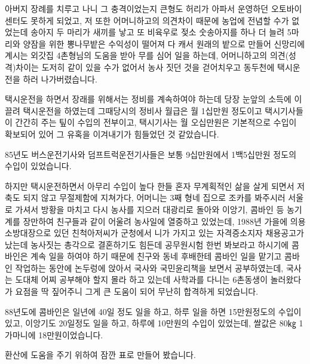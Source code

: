\documentclass[chapter,book,openany,twoside]{oblivoir}
\begin{document}
아버지 장례를 치루고 나니 그 충격이었는지 큰형도 허리가 아파서 운영하던 오토바이센터도 못하게 되었고, 저 또한 어머니하고의 의견차이 때문에 농업에 전념할 수가 없었는데 송아지 두 마리가 새끼를 낳고 또 비육우로 젖소 숫송아지를 하나 더 늘려 5마리와 양잠을 위한 뽕나무밭은 수익성이 떨어져 다 캐서 원래의 밭으로 만들어 신망리에 계시는 외갓집 4촌형님의 도움을 받아 무를 심어 일을 하는데, 어머니하고의 의견(성격)차이는 도저히 같이 있을 수가 없어서 농사 짓던 것을 걷어치우고 동두천에 택시운전을 하러 나가버렸습니다. 

택시운전을 하면서 장래를 위해서는 정비를 계속하여야 하는데 당장 눈앞의 소득에 이끌려 택시운전을 하였는데 그때당시의 정비사 월급은 월 1십만원 정도이고 택시기사들이 간간히 주는 팊이 수입의 전부이고, 택시기사는 월 오십만원은 기본적으로 수입이 확보되어 있어 그 유혹을 이겨내기가 힘들었던 것 같았습니다. 

85년도 버스운전기사와 덤프트럭운전기사들은 보통 9십만원에서 1백5십만원 정도의 수입이 있었습니다. 

하지만 택시운전하면서 아무리 수입이 높다 한들 혼자 무계획적인 삶을 살게 되면서 저축도 되지 않고 무절제함에 지쳐가다, 어머니는 3째 형네 집으로 조카를 봐주시러 서울로 가셔서 방황을 마치고 다시 농사를 지으러 대광리로 돌아와 이앙기, 콤바인 등 농기계를 장만하여 친구들과 같이 어울려 농사일에 열중하고 있었는데, 1988년 가을에 의용소방대장으로 있던 친척아저씨가 군청에서 니가 가지고 있는 자격증소지자 채용공고가 났는데 농사짓는 총각으로 결혼하기도 힘든데 공무원시험 한번 봐보라고 하시기에 콤바인은 계속 일을 하여야 하기 때문에 친구와 동네 후배한테 콤바인 일을 맡기고 콤바인 작업하는 동안에 논두렁에 앉아서 국사와 국민윤리책을 보면서 공부하였는데, 국사는 도대체 어찌 공부해야 할지 몰라 하고 있는데 사학과를 다니는 6촌동생이 놀러왔다가 요점을 딱 짚어주니 그게 큰 도움이 되어 무난히 합격하게 되었습니다.

88년도에 콤바인은 일년에 40일 정도 일을 하고, 하루 일을 하면 15만원정도의 수입이 있고, 이앙기도 20일정도 일을 하고, 하루에 10만원의 수입이 있었는데, 쌀값은 80㎏ 1가마니에 18만원이었습니다. 

환산에 도움을 주기 위하여 잠깐 표로 만들어 봤습니다. 
\end{document}
